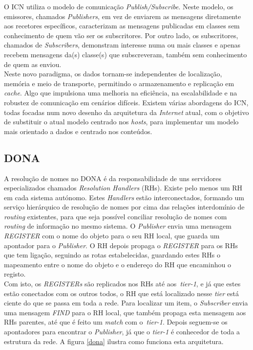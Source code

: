 \documentclass[conference]{IEEEtran}
\begin{document}
O ICN utiliza o modelo de comunica\c{c}\~{a}o \textit{Publish/Subscribe}. Neste modelo, os emissores, chamados \textit{Publishers}, em vez de enviarem as mensagens diretamente aos recetores espec\'{i}ficos, caracterizam as mensagens publicadas em classes sem conhecimento de quem v\~{a}o ser os subscritores. Por outro lado, os subscritores, chamados de \textit{Subscribers}, demonstram interesse numa ou mais classes e apenas recebem mensagens da(s) classe(s) que subscreveram, tamb\'{e}m sem conhecimento de quem as enviou.\\ 

Neste novo paradigma, os dados tornam-se independentes de localiza\c{c}\~{a}o, mem\'{o}ria e meio de transporte, permitindo o armazenamento e replica\c{c}\~{a}o em \textit{cache}. Algo que impulsiona uma melhoria na efici\^{e}ncia, na escalabilidade e na robustez de comunica\c{c}\~{a}o em cen\'{a}rios dif\'{i}ceis. Existem v\'{a}rias abordagens do ICN, todas focadas num novo desenho da arquitetura da \textit{Internet} atual, com o objetivo de substituir o atual modelo centrado nos \textit{hosts}, para implementar um modelo mais orientado a dados e centrado nos conte\'{u}dos\cite{surveyICN}.\\



\subsection{DONA}

A resolu\c{c}\~{a}o de nomes no DONA\cite{dona} \'{e} da responsabilidade de uns servidores especializados chamados \textit{Resolution Handlers} (RHs). Existe pelo menos um RH em cada sistema aut\'{o}nomo. Estes \textit{Handlers} est\~{a}o interconectados, formando um servi\c{c}o hier\'{a}rquico de resolu\c{c}\~{a}o de nomes por cima das rela\c{c}\~{o}es interdom\'{i}nio de \textit{routing} existentes, para que seja poss\'{i}vel conciliar resolu\c{c}\~{a}o de nomes com \textit{routing} de informa\c{c}\~{a}o no mesmo sistema. O \textit{Publisher} envia uma mensagem \textit{REGISTER} com o nome do objeto para o seu RH local, que guarda um apontador para o \textit{Publisher}. O RH depois propaga o \textit{REGISTER} para os RHs que tem liga\c{c}\~{a}o, seguindo as rotas estabelecidas, guardando estes RHs o mapeamento entre o nome do objeto e o endere\c{c}o do RH que encaminhou o registo.\\

 Com isto, os \textit{REGISTERs} s\~{a}o replicados nos RHs at\'{e} aos~\textit{tier-1}, e j\'{a} que estes est\~{a}o conectados com os outros todos, o RH que est\'{a} localizado nesse \textit{tier} est\'{a} ciente do que se passa em toda a rede. Para localizar um item, o \textit{Subscriber} envia uma mensagem \textit{FIND} para o RH local, que tamb\'{e}m propaga esta mensagem aos RHs parentes, at\'{e} que \'{e} feito um \textit{match} com o~\textit{tier-1}. Depois seguem-se os apontadores para encontrar o \textit{Publisher}, j\'{a} que o \textit{tier-1} \'{e} conhecedor de toda a estrutura da rede. A figura \ref{dona} ilustra como funciona esta arquitetura.\\
\end{document}
